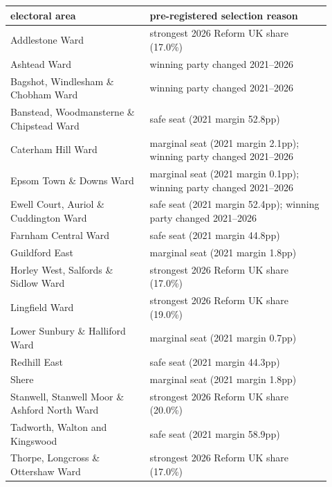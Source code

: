 \begin{tabular}{p{0.40\linewidth}p{0.52\linewidth}}
\toprule
electoral area & pre-registered selection reason \\
\midrule
Addlestone Ward & strongest 2026 Reform UK share (17.0\%) \\
Ashtead Ward & winning party changed 2021--2026 \\
Bagshot, Windlesham \& Chobham Ward & winning party changed 2021--2026 \\
Banstead, Woodmansterne \& Chipstead Ward & safe seat (2021 margin 52.8pp) \\
Caterham Hill Ward & marginal seat (2021 margin 2.1pp); winning party changed 2021--2026 \\
Epsom Town \& Downs Ward & marginal seat (2021 margin 0.1pp); winning party changed 2021--2026 \\
Ewell Court, Auriol \& Cuddington Ward & safe seat (2021 margin 52.4pp); winning party changed 2021--2026 \\
Farnham Central Ward & safe seat (2021 margin 44.8pp) \\
Guildford East & marginal seat (2021 margin 1.8pp) \\
Horley West, Salfords \& Sidlow Ward & strongest 2026 Reform UK share (17.0\%) \\
Lingfield Ward & strongest 2026 Reform UK share (19.0\%) \\
Lower Sunbury \& Halliford Ward & marginal seat (2021 margin 0.7pp) \\
Redhill East & safe seat (2021 margin 44.3pp) \\
Shere & marginal seat (2021 margin 1.8pp) \\
Stanwell, Stanwell Moor \& Ashford North Ward & strongest 2026 Reform UK share (20.0\%) \\
Tadworth, Walton and Kingswood & safe seat (2021 margin 58.9pp) \\
Thorpe, Longcross \& Ottershaw Ward & strongest 2026 Reform UK share (17.0\%) \\
\bottomrule
\end{tabular}
